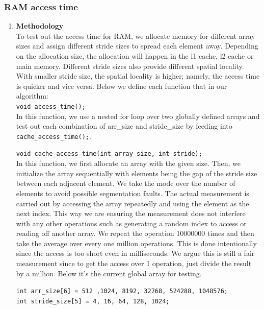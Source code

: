 \subsubsection{RAM access time}
\begin{enumerate}[\bfseries (a), wide, labelwidth=!, labelindent=0pt]
    \item \textbf{Methodology}\\
    To test out the access time for RAM, we allocate memory for different array sizes and assign different stride sizes to spread each element away. Depending on the allocation size, the allocation will happen in the l1 cache, l2 cache or main memory. Different stride sizes also provide different spatial locality. With smaller stride size, the spatial locality is higher; namely, the access time is quicker and vice versa. Below we define each function that in our algorithm:\\
    \hline \hline 
    \noindent\texttt{void access_time();}\\
    In this function, we use a nested for loop over two globally defined arrays and test out each combination of arr\_size and stride\_size by feeding into \texttt{cache_access_time();}.

    \noindent\texttt{void cache_access_time(int array_size, int stride);}\\
    In this function, we first allocate an array with the given size. Then, we initialize the array sequentially with elements being the gap of the stride size between each adjacent element. We take the mode over the number of elements to avoid possible segmentation faults. The actual measurement is carried out by accessing the array repeatedly and using the element as the next index. This way we are ensuring the measurement does not interfere with any other operations such as generating a random index to access or reading off another array. We repeat the operation 10000000 times and then take the average over every one million operations. This is done intentionally since the access is too short even in milliseconds. We argue this is still a fair measurement since to get the access over 1 operation, just divide the result by a million. Below it’s the current global array for testing.
    
    \noindent\texttt{int arr_size[6] = {512 ,1024, 8192, 32768, 524288, 1048576};}\\
    \noindent\texttt{int stride_size[5] = {4, 16, 64, 128, 1024};}\\
    \hline \hline 


\end{enumerate}
